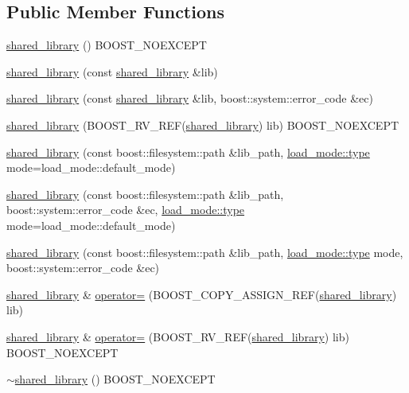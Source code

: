 \subsection*{Public Member Functions}
\begin{DoxyCompactItemize}
\item 
\hyperlink{a01708_a2ebb56c35c652538adac15f9e7042bc3}{shared\+\_\+library} () B\+O\+O\+S\+T\+\_\+\+N\+O\+E\+X\+C\+E\+PT
\item 
\hyperlink{a01708_a89eee45a2a309e7f4cfaba95873f30f8}{shared\+\_\+library} (const \hyperlink{a01708}{shared\+\_\+library} \&lib)
\item 
\hyperlink{a01708_a27f628687eb5d0a47d47f981d429ac33}{shared\+\_\+library} (const \hyperlink{a01708}{shared\+\_\+library} \&lib, boost\+::system\+::error\+\_\+code \&ec)
\item 
\hyperlink{a01708_a829033a804256cb41211865a6c056aff}{shared\+\_\+library} (B\+O\+O\+S\+T\+\_\+\+R\+V\+\_\+\+R\+EF(\hyperlink{a01708}{shared\+\_\+library}) lib) B\+O\+O\+S\+T\+\_\+\+N\+O\+E\+X\+C\+E\+PT
\item 
\hyperlink{a01708_afbfcc22b1a9089f474f05760c09a2261}{shared\+\_\+library} (const boost\+::filesystem\+::path \&lib\+\_\+path, \hyperlink{a00272_a1918a602801479bc0bade54ff5665129}{load\+\_\+mode\+::type} mode=load\+\_\+mode\+::default\+\_\+mode)
\item 
\hyperlink{a01708_a1827a294cc24c62c6fa06421be915690}{shared\+\_\+library} (const boost\+::filesystem\+::path \&lib\+\_\+path, boost\+::system\+::error\+\_\+code \&ec, \hyperlink{a00272_a1918a602801479bc0bade54ff5665129}{load\+\_\+mode\+::type} mode=load\+\_\+mode\+::default\+\_\+mode)
\item 
\hyperlink{a01708_ac5ca8102f3476173d70f101d07c8fb8d}{shared\+\_\+library} (const boost\+::filesystem\+::path \&lib\+\_\+path, \hyperlink{a00272_a1918a602801479bc0bade54ff5665129}{load\+\_\+mode\+::type} mode, boost\+::system\+::error\+\_\+code \&ec)
\item 
\hyperlink{a01708}{shared\+\_\+library} \& \hyperlink{a01708_a5f68b31fd48dcd4384cb4052af3a7df6}{operator=} (B\+O\+O\+S\+T\+\_\+\+C\+O\+P\+Y\+\_\+\+A\+S\+S\+I\+G\+N\+\_\+\+R\+EF(\hyperlink{a01708}{shared\+\_\+library}) lib)
\item 
\hyperlink{a01708}{shared\+\_\+library} \& \hyperlink{a01708_a174c64366a283023ca45b80ab27cdcfe}{operator=} (B\+O\+O\+S\+T\+\_\+\+R\+V\+\_\+\+R\+EF(\hyperlink{a01708}{shared\+\_\+library}) lib) B\+O\+O\+S\+T\+\_\+\+N\+O\+E\+X\+C\+E\+PT
\item 
\hyperlink{a01708_aa8df68945bd8598c3b873f622d6d2baa}{$\sim$shared\+\_\+library} () B\+O\+O\+S\+T\+\_\+\+N\+O\+E\+X\+C\+E\+PT

\end{DoxyCompactItemize}
